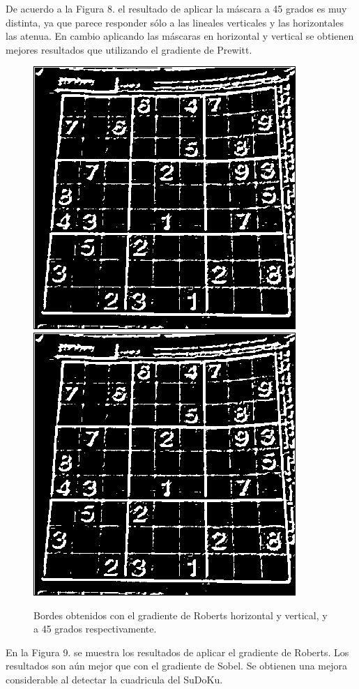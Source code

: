 \documentclass[conference]{IEEEtran}
\begin{document}
De acuerdo a la Figura 8. el resultado de aplicar la m\'ascara a 45 grados es muy distinta, ya que parece responder s\'olo a las lineales verticales y las horizontales las atenua. En cambio aplicando las m\'ascaras en horizontal y vertical se obtienen mejores resultados que utilizando el gradiente de Prewitt.
\newpage
\begin{figure}[h]
	\centering
	\setlength{\unitlength}{0.00105in}
	\includegraphics[scale=0.43]{./images/robertsXY.png}
	\includegraphics[scale=0.43]{./images/roberts45.png}
	\caption{Bordes obtenidos con el gradiente de Roberts horizontal y vertical, y a 45 grados respectivamente. }
\end{figure}

En la Figura 9. se muestra los resultados de aplicar el gradiente de Roberts. Los resultados son a\'un mejor que con el gradiente de Sobel. Se obtienen una mejora considerable al detectar la cuadricula del SuDoKu.\\\\
\end{document}
